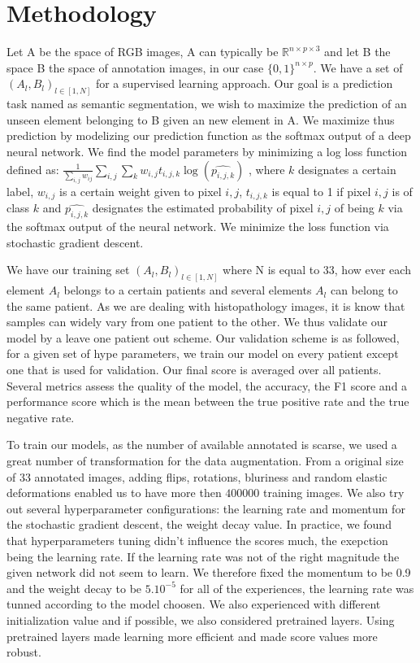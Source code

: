 \documentclass{article}
\begin{document}
\section{Methodology}
\label{sec:method}
\noindent Let A be the space of RGB images, A can typically be 
$\mathbb{R}^{n \times p \times 3}$ and let B the space B the space of annotation 
images, in our case $\{0,1\}^{n \times p}$. We have a set of 
$(A_l,B_l)_{l \in [1, N]}$ for a supervised learning approach. Our goal is 
a prediction task 
named as semantic segmentation, we wish to maximize the prediction of 
an unseen element belonging to B given an new element in A. We maximize 
thus prediction by modelizing our prediction function as the softmax output of a deep neural 
network. We find the model parameters by minimizing a log loss function 
defined as:
 $\frac{1}{\sum_{i,j}w_{ij}} \sum_{i,j} \sum_k w_{i,j} t_{i,j,k} \log (\widehat{p_{i,j,k}})$
, where $k$ designates a certain label, $w_{i,j}$ is a 
certain weight given to pixel $i,j$, $t_{i,j,k}$ is equal to 1 if pixel $i,j$ is 
of class $k$ and $\widehat{p_{i,j,k}}$ designates the estimated probability 
of pixel $i,j$ of being $k$ via the softmax output of the neural network.
We minimize the loss function via stochastic gradient descent.

We have our training set $(A_l,B_l)_{l \in [1, N]}$ where N is equal to 
33, how ever each element $A_l$ belongs to a certain patients and 
several elements $A_l$ can belong to the same patient. As we are 
dealing with histopathology images, it is know that samples can widely 
vary from one patient to the other. We thus validate our model by a 
leave one patient out scheme. Our validation scheme is as followed, for a 
given set of hype parameters, we 
train our model on every patient except one that is used for validation. 
Our final score is averaged over all patients.
Several metrics assess the quality of the model, the accuracy, the 
F1 score and a performance score which is the mean between the 
true positive rate and the true negative rate.

To train our models, as the number of available annotated is scarse, we 
used a great number of transformation for the data augmentation. From 
a original size of 33 annotated images, adding flips, rotations, bluriness 
and random elastic deformations enabled us to have more then 
$400 000$ training images. 
We also try out several hyperparameter configurations: the learning rate and 
momentum for the stochastic gradient descent, the weight decay value.  
In practice, we found that hyperparameters tuning didn't influence the 
scores much, the exepction being the learning rate. If the learning rate 
was not of the right magnitude the given network did not seem to learn. 
We therefore fixed the momentum to be 0.9 and the weight decay to be 
$5.10^{-5}$ for all of the experiences, the learning rate was tunned 
according to the model choosen.
We also experienced with different 
initialization value and if possible, we also considered pretrained layers. 
Using pretrained layers made learning more efficient and made score 
values more robust.
\end{document}
